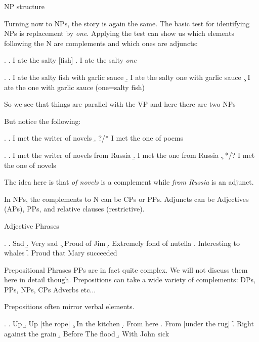 \begin{frame}
  {NP structure}

Turning now to NPs, the story is again the same.  The basic test for identifying NPs is replacement by \textit{one}.  Applying the test can show us which elements following the N are complements and which ones are adjuncts:

\ex.
\a. I ate the salty [fish]
\b. I ate the salty \textit{one}


\ex.
\a. I ate the salty fish with garlic sauce
\b. I ate the salty one with garlic sauce
\c. I ate the one with garlic sauce (one=salty fish)

So we see that things are parallel with the VP and here there are two NPs

\end{frame}


\begin{frame}
  But notice the following:

\ex.
\a. I met the writer of novels
\b. ?/* I met the one of poems

\ex.
\a. I met the writer of novels from Russia
\b. I met the one from Russia
\c. */? I met the one of novels 


The idea here is that \textit{of novels} is a complement while \textit{from Russia} is an adjunct.

\end{frame}

\begin{frame}
  In NPs, the complements to N can be CPs or PPs.  Adjuncts can be Adjectives (APs), PPs, and relative clauses (restrictive).
\end{frame}

\begin{frame}
  {Adjective Phrases}

\ex.
\a. Sad
\b. Very sad
\c. Proud of Jim
\d. Extremely fond of nutella
\e. Interesting to whales
\f. Proud that Mary succeeded


\end{frame}


\begin{frame}
  {Prepositional Phrases}
PPs are in fact quite complex.  We will not discuss them here in detail though.  Prepositions can take a wide variety of complements:  DPs, PPs, NPs, CPs Adverbs etc...

Prepositions often mirror verbal elements.

\ex.
\a. Up
\b. Up [the rope]
\c. In the kitchen
\d.  From here
\e. From [under the rug]
\f. Right against the grain
\b. Before The flood
\b. With John sick

\end{frame}

